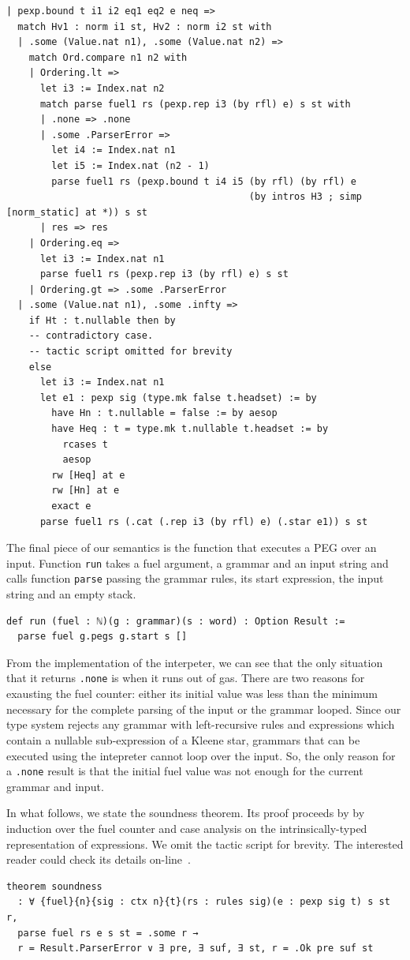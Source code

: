 \documentclass[preprint,12pt]{elsarticle}
\theoremstyle{definition}
\begin{document}
\begin{lstlisting}
| pexp.bound t i1 i2 eq1 eq2 e neq =>
  match Hv1 : norm i1 st, Hv2 : norm i2 st with
  | .some (Value.nat n1), .some (Value.nat n2) =>
    match Ord.compare n1 n2 with
    | Ordering.lt =>
      let i3 := Index.nat n2
      match parse fuel1 rs (pexp.rep i3 (by rfl) e) s st with
      | .none => .none
      | .some .ParserError =>
        let i4 := Index.nat n1
        let i5 := Index.nat (n2 - 1)
        parse fuel1 rs (pexp.bound t i4 i5 (by rfl) (by rfl) e
                                           (by intros H3 ; simp [norm_static] at *)) s st
      | res => res
    | Ordering.eq =>
      let i3 := Index.nat n1
      parse fuel1 rs (pexp.rep i3 (by rfl) e) s st
    | Ordering.gt => .some .ParserError
  | .some (Value.nat n1), .some .infty =>
    if Ht : t.nullable then by
    -- contradictory case.
    -- tactic script omitted for brevity
    else
      let i3 := Index.nat n1
      let e1 : pexp sig (type.mk false t.headset) := by
        have Hn : t.nullable = false := by aesop
        have Heq : t = type.mk t.nullable t.headset := by
          rcases t
          aesop
        rw [Heq] at e
        rw [Hn] at e
        exact e
      parse fuel1 rs (.cat (.rep i3 (by rfl) e) (.star e1)) s st
\end{lstlisting}
The final piece of our semantics is the function that executes a PEG
over an input. Function \lstinline|run| takes a fuel argument, a grammar
and an input string and calls function \lstinline|parse| passing the grammar
rules, its start expression, the input string and an empty stack.
\begin{lstlisting}
def run (fuel : ℕ)(g : grammar)(s : word) : Option Result :=
  parse fuel g.pegs g.start s []
\end{lstlisting}

From the implementation of the interpeter, we can see that the only situation
that it returns \lstinline|.none| is when it runs out of gas. There are two reasons
for exausting the fuel counter: either its initial value was less than the minimum
necessary for the complete parsing of the input or the grammar looped. Since our
type system rejects any grammar with left-recursive rules and expressions which
contain a nullable sub-expression of a Kleene star, grammars that can be executed
using the intepreter cannot loop over the input. So, the only reason for
a \lstinline|.none| result is that the initial fuel value was not enough for
the current grammar and input.

In what follows, we state the soundness theorem. Its proof proceeds by
by induction over the fuel counter and case analysis on the
intrinsically-typed representation of expressions. We omit the tactic
script for brevity. The interested reader could check its details on-line~\cite{pegrepository}.
\begin{lstlisting}
theorem soundness
  : ∀ {fuel}{n}{sig : ctx n}{t}(rs : rules sig)(e : pexp sig t) s st r,
  parse fuel rs e s st = .some r →
  r = Result.ParserError ∨ ∃ pre, ∃ suf, ∃ st, r = .Ok pre suf st
\end{lstlisting}
\end{document}
